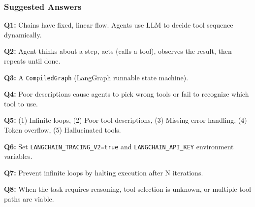 \documentclass[aspectratio=169,11pt]{beamer}
\begin{document}
\begin{frame}
\frametitle{Suggested Answers}

\textbf{Q1:} Chains have fixed, linear flow. Agents use LLM to decide tool sequence dynamically.

\vspace{0.2cm}

\textbf{Q2:} Agent thinks about a step, acts (calls a tool), observes the result, then repeats until done.

\vspace{0.2cm}

\textbf{Q3:} A \texttt{CompiledGraph} (LangGraph runnable state machine).

\vspace{0.2cm}

\textbf{Q4:} Poor descriptions cause agents to pick wrong tools or fail to recognize which tool to use.

\vspace{0.2cm}

\textbf{Q5:} (1) Infinite loops, (2) Poor tool descriptions, (3) Missing error handling, (4) Token overflow, (5) Hallucinated tools.

\vspace{0.2cm}

\textbf{Q6:} Set \texttt{LANGCHAIN\_TRACING\_V2=true} and \texttt{LANGCHAIN\_API\_KEY} environment variables.

\vspace{0.2cm}

\textbf{Q7:} Prevent infinite loops by halting execution after N iterations.

\vspace{0.2cm}

\textbf{Q8:} When the task requires reasoning, tool selection is unknown, or multiple tool paths are viable.

\end{frame}
\end{document}
